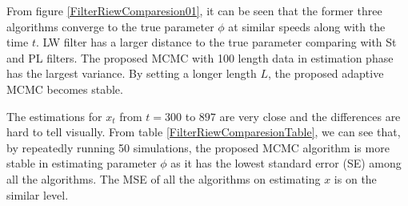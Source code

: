 

From figure \ref{FilterRiewComparesion01}, it can be seen that the former three algorithms converge to the true parameter $\phi$ at similar speeds along with the time $t$. LW filter has a larger distance to the true parameter comparing with St and PL filters. The proposed MCMC with 100 length data in estimation phase has the largest variance. By setting a longer length $L$, the proposed adaptive MCMC becomes stable. 

The estimations for $x_t$ from $t=300$ to $897$ are very close and the differences are hard to tell visually. From table \ref{FilterRiewComparesionTable}, we can see that, by repeatedly running 50 simulations, the proposed MCMC algorithm is more stable in estimating parameter $\phi$ as it has the lowest standard error (SE) among all the algorithms. The MSE of all the algorithms on estimating $x$ is on the similar level.  


